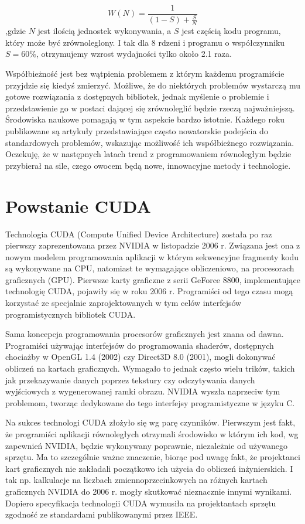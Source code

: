 \begin{equation}
W(N) = \frac{1}{(1-S) + \frac{S}{N}}
\end{equation}
,gdzie $N$ jest ilością jednostek wykonywania, a $S$ jest częścią kodu programu,
	który może być zrównoleglony. I tak dla 8 rdzeni i programu o współczynniku
	$S=60\%$, otrzymujemy wzrost wydajności tylko około 2.1 raza.

Współbieżność jest bez wątpienia problemem z którym każdemu programiście
przyjdzie się kiedyś zmierzyć. Możliwe, że do niektórych problemów wystarczą mu
gotowe rozwiązania z dostępnych bibliotek, jednak myślenie o problemie i
przedstawienie go w postaci dającej się zrównoleglić będzie rzeczą
najważniejszą. Środowiska naukowe pomagają w tym aspekcie bardzo istotnie.
Każdego roku publikowane są artykuły przedstawiające często nowatorskie
podejścia do standardowych problemów, wskazując możliwość ich współbieżnego rozwiązania.
Oczekuję, że w następnych latach trend z programowaniem równoległym będzie
przybierał na sile, czego owocem będą nowe, innowacyjne metody i technologie.

\section{Powstanie CUDA}

Technologia CUDA (Compute Unified Device Architecture) została po raz pierwszy
zaprezentowana przez NVIDIA w listopadzie 2006 r. Związana jest ona z nowym
modelem
programowania aplikacji w którym sekwencyjne fragmenty kodu są wykonywane na
CPU, natomiast te wymagające obliczeniowo, na procesorach graficznych (GPU).
Pierwsze karty graficzne z serii GeForce 8800, implementujące technologię CUDA,
		 pojawiły się w roku 2006 r. Programiści od tego czasu mogą korzystać ze
		 specjalnie zaprojektowanych w tym celów interfejsów programistycznych
		 bibliotek CUDA.

Sama koncepcja programowania procesorów graficznych jest znana od dawna.
Programiści używając interfejsów do programowania shaderów, dostępnych chociażby
w OpenGL 1.4 (2002) czy Direct3D 8.0 (2001), mogli dokonywać 
obliczeń na kartach graficznych. Wymagało to jednak często wielu trików, takich
jak przekazywanie danych poprzez tekstury czy odczytywania danych wyjściowych z
wygenerowanej ramki obrazu. NVIDIA wyszła naprzeciw tym problemom, tworząc
dedykowane do tego interfejsy programistyczne w języku C.

Na sukces technologi CUDA złożyło się wg \cite{massive} parę czynników.
Pierwszym jest fakt, że programiści aplikacji równoległych otrzymali środowisko
w którym ich kod, wg zapewnień NVIDIA, będzie wykonywany poprawnie, niezależnie
od używanego sprzętu. Ma to szczególnie ważne znaczenie, biorąc pod uwagę fakt,
   że projektanci kart graficznych nie zakładali początkowo ich użycia do
   obliczeń inżynierskich. I tak np. kalkulacje na liczbach zmiennoprzecinkowych
   na różnych kartach graficznych NVIDIA do 2006 r. mogły skutkować nieznacznie innymi
   wynikami. Dopiero specyfikacja technologii CUDA wymusiła na projektantach
   sprzętu zgodność ze standardami publikowanymi przez IEEE.


